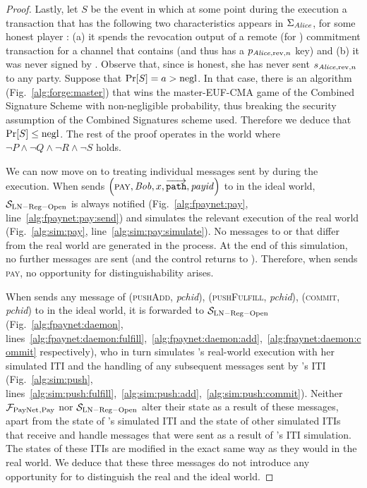 \begin{proof}
  Lastly, let $S$ be the event in which at some point during the execution a
  transaction that has the following two characteristics appears in
  $\Sigma_{\mathit{Alice}}$, for some honest player \alice: (a) it spends the revocation
  output of a remote (for \alice{}) commitment transaction for a channel that
  contains \alice{} (and thus has a $p_{\mathit{Alice}, \mathrm{rev}, n}$ key) and (b)
  it was never signed by \alice. Observe that, since \alice{} is honest, she has
  never sent $s_{\mathit{Alice}, \mathrm{rev}, n}$ to any party. Suppose that $\Pr[S] =
  a > \text{negl}$. In that case, there is an algorithm (Fig.~\ref{alg:forge:master})
  that wins the \textsf{master-EUF-CMA} game of the Combined Signature Scheme
  with non-negligible probability, thus breaking the security assumption of the
  Combined Signatures scheme used. Therefore we deduce that $\Pr[S] \leq \text{negl}$.
  The rest of the proof operates in the world where $\neg P \wedge \neg Q \wedge
  \neg R \wedge \neg S$ holds.

  We can now move on to treating individual messages sent by \environment{}
  during the execution. When \environment{} sends $\left(\textsc{pay}, \mathit{Bob}, x,
  \overrightarrow{\mathtt{path}}, \mathit{payid}\right)$ to \alice{} in the
  ideal world, $\mathcal{S}_{\mathrm{LN - Reg - Open}}$ is always notified
  (Fig.~\ref{alg:fpaynet:pay}, line~\ref{alg:fpaynet:pay:send}) and simulates
  the relevant execution of the real world (Fig.~\ref{alg:sim:pay},
  line~\ref{alg:sim:pay:simulate}). No messages to \ledger{} or \environment{}
  that differ from the real world are generated in the process. At the end of
  this simulation, no further messages are sent (and the control returns to
  \environment). Therefore, when \environment{} sends \textsc{pay}, no
  opportunity for distinguishability arises.

  When \environment{} sends any message of (\textsc{pushAdd}, \textit{pchid}),
  (\textsc{pushFulfill}, \textit{pchid}), (\textsc{commit}, \textit{pchid}) to
  \alice{} in the ideal world, it is forwarded to $\mathcal{S}_{\mathrm{LN - Reg
  - Open}}$ (Fig.~\ref{alg:fpaynet:daemon},
  lines~\ref{alg:fpaynet:daemon:fulfill},~\ref{alg:fpaynet:daemon:add},~\ref{alg:fpaynet:daemon:commit}
  respectively), who in turn simulates \alice's real-world execution with her
  simulated ITI and the handling of any subsequent messages sent by \alice's ITI
  (Fig.~\ref{alg:sim:push},
  lines~\ref{alg:sim:push:fulfill},~\ref{alg:sim:push:add},~\ref{alg:sim:push:commit}).
  Neither $\mathcal{F}_{\mathrm{PayNet}}{}_{\mathrm{, Pay}}$ nor $\mathcal{S}_{\mathrm{LN - Reg -
  Open}}$ alter their state as a result of these messages, apart from the state
  of \alice's simulated ITI and the state of other simulated ITIs that receive
  and handle messages that were sent as a result of \alice's ITI simulation. The
  states of these ITIs are modified in the exact same way as they would in the
  real world. We deduce that these three messages do not introduce any
  opportunity for \environment{} to distinguish the real and the ideal world.


\end{proof}
